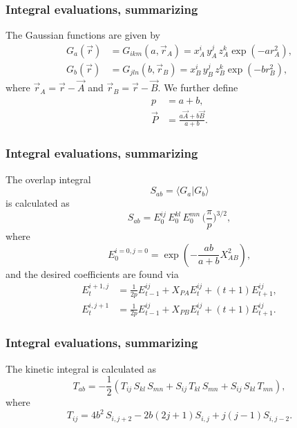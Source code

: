 {
  \frametitle{Integral evaluations, summarizing}
\begin{small}
{\scriptsize
The Gaussian functions are given by
\begin{equation}
 \begin{split}
  G_a(\vec r) & = G_{ikm}(a, \vec r_A) = x^i_A\,y^j_A\,z^k_A\exp(-a r^2_A), \\
  G_b(\vec r) & = G_{jln}(b, \vec r_B) = x^i_B\,y^j_B\,z^k_B\exp(-b r^2_B),
 \end{split}
\end{equation}
where $\vec r_A = \vec r - \vec A$ and $\vec r_B = \vec r - \vec B$. We further define
\begin{equation}
\begin{split}
  p & = a + b, \\
 \vec P & = \frac{a\vec A + b\vec B}{a + b}.
\end{split}
\end{equation}
}
\end{small}
}
\frame
{
  \frametitle{Integral evaluations, summarizing}
\begin{small}
{\scriptsize
The overlap integral
\begin{equation}
 S_{ab} = \langle G_a|G_b\rangle
\end{equation}
is calculated as
\begin{equation}
 S_{ab} = E^{ij}_0\,E^{kl}_0\,E^{mn}_0\,\Big(\frac{\pi}{p}\Big)^{3/2},
\end{equation}
where
\begin{equation}
 E^{i=0,j=0}_0 = \exp(-\frac{ab}{a+b}X_{AB}^2),
\end{equation}
and the desired coefficients are found via
\begin{equation}
\begin{split}
 E^{i+1,j}_t & = \frac{1}{2p}E^{ij}_{t-1} + X_{PA}E^{ij}_t + (t+1)E^{ij}_{t+1}, \\
 E^{i,j+1}_t & = \frac{1}{2p}E^{ij}_{t-1} + X_{PB}E^{ij}_t + (t+1)E^{ij}_{t+1}.
\end{split}
\end{equation}
}
\end{small}
}
\frame
{
  \frametitle{Integral evaluations, summarizing}
\begin{small}
{\scriptsize
The kinetic integral is calculated as
\begin{equation}
 T_{ab} = -\frac{1}{2}(T_{ij}\,S_{kl}\,S_{mn} + S_{ij}\,T_{kl}\,S_{mn} + S_{ij}\,S_{kl}\,T_{mn}),
\end{equation}
where
\begin{equation}
 T_{ij} = 4b^2\,S_{i,j+2} - 2b(2j + 1)S_{i,j} + j(j-1)S_{i,j-2}.
\end{equation}
}
\end{small}
}

